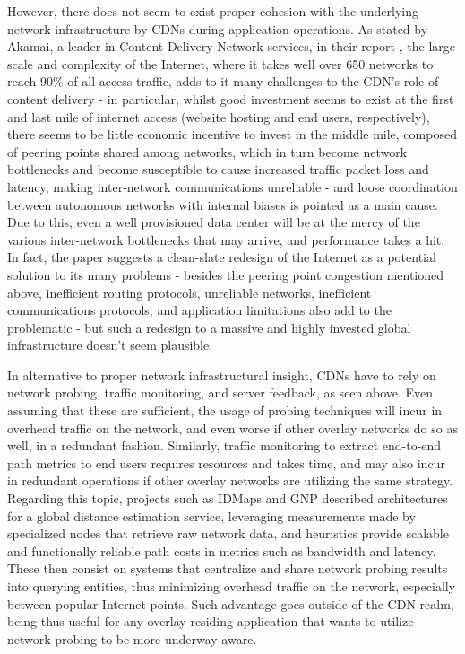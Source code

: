     However, there does not seem to exist proper cohesion with the underlying network infrastructure by CDNs during application operations.
    As stated by Akamai, a leader in Content Delivery Network services, in their report \cite{akamai-report}, the large scale and complexity of the Internet, where it takes well over 650 networks to reach 90\% of all access traffic, adds to it many challenges to the CDN's role of content delivery - in particular, whilst good investment seems to exist at the first and last mile of internet access (website hosting and end users, respectively), there seems to be little economic incentive to invest in the middle mile, composed of peering points shared among networks, which in turn become network bottlenecks and become susceptible to cause increased traffic packet loss and latency, making inter-network communications unreliable - and loose coordination between autonomous networks with internal biases is pointed as a main cause.
    Due to this, even a well provisioned data center will be at the mercy of the various inter-network bottlenecks that may arrive, and performance takes a hit.
    In fact, the paper suggests a clean-slate redesign of the Internet as a potential solution to its many problems - besides the peering point congestion mentioned above, inefficient routing protocols, unreliable networks, inefficient communications protocols, and application limitations also add to the problematic - but such a redesign to a massive and highly invested global infrastructure doesn't seem plausible.

    In alternative to proper network infrastructural insight, CDNs have to rely on network probing, traffic monitoring, and server feedback, as seen above.
    Even assuming that these are sufficient, the usage of probing techniques will incur in overhead traffic on the network, and even worse if other overlay networks do so as well, in a redundant fashion.
    Similarly, traffic monitoring to extract end-to-end path metrics to end users requires resources and takes time, and may also incur in redundant operations if other overlay networks are utilizing the same strategy.
    Regarding this topic, projects such as IDMaps \cite{IDMaps} and GNP \cite{GNP} described architectures for a global distance estimation service, leveraging measurements made by specialized nodes that retrieve raw network data, and heuristics provide scalable and functionally reliable path costs in metrics such as bandwidth and latency.
    These then consist on systems that centralize and share network probing results into querying entities, thus minimizing overhead traffic on the network, especially between popular Internet points.
    Such advantage goes outside of the CDN realm, being thus useful for any overlay-residing application that wants to utilize network probing to be more underway-aware.

